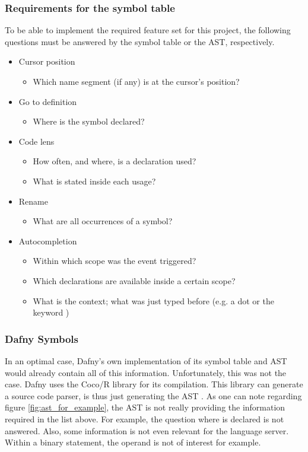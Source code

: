 \subsubsection{Requirements for the symbol table}
To be able to implement the required feature set for this project, the following questions must be answered by the symbol table or the AST, respectively.
\begin{itemize}
    \item Cursor position
    \begin{itemize}
        \item Which name segment (if any) is at the cursor's position?
    \end{itemize}

    \item Go to definition
        \begin{itemize}
            \item Where is the symbol declared?
        \end{itemize}

    \item Code lens
        \begin{itemize}
            \item How often, and where, is a declaration used?
            \item What is stated inside each usage?
        \end{itemize}

    \item Rename
        \begin{itemize}
            \item What are all occurrences of a symbol?
        \end{itemize}

    \item Autocompletion
        \begin{itemize}
            \item Within which scope was the event triggered?
            \item Which declarations are available inside a certain scope?
            \item What is the context; what was just typed before (e.g. a dot or the keyword )
        \end{itemize}
\end{itemize}


\subsubsection{Dafny Symbols}
In an optimal case, Dafny's own implementation of its symbol table and AST would already contain all of this information.
Unfortunately, this was not the case.
Dafny uses the Coco/R library for its compilation.
This library can generate a source code parser, is thus just generating the AST \cite{coco}.
As one can note regarding figure \ref{fig:ast_for_example}, the AST is not really providing the information required in the list above.
For example, the question where  is declared is not answered.
Also, some information is not even relevant for the language server.
Within a binary statement, the operand is not of interest for example.\\

